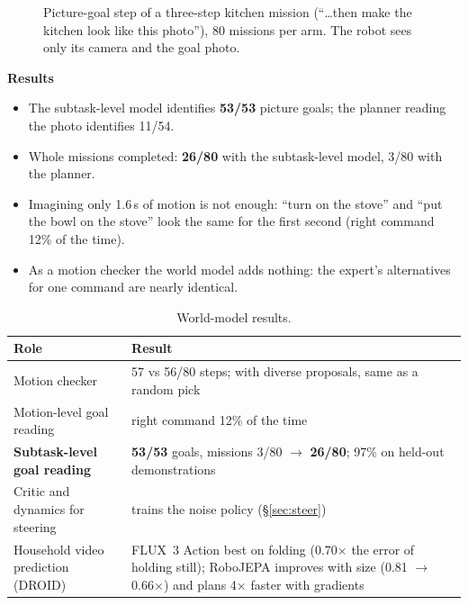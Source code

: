 \documentclass[11pt,a4paper]{article}
\newcommand{\sub}[1]{\par\needspace{4\baselineskip}\smallskip\noindent\textbf{#1}\par}
\begin{document}
\begin{figure}[!htbp]\centering
{}
\caption{Picture-goal step of a three-step kitchen mission (``\ldots then make the kitchen look like this photo''), 80 missions per arm. The robot sees only its camera and the goal photo.}
\label{fig:wm}
\end{figure}

\sub{Results}
\begin{itemize}
\item The subtask-level model identifies \textbf{53/53} picture goals; the planner reading the photo identifies 11/54.
\item Whole missions completed: \textbf{26/80} with the subtask-level model, 3/80 with the planner.
\item Imagining only 1.6\,s of motion is not enough: ``turn on the stove'' and ``put the bowl on the stove'' look the same for the first second (right command 12\% of the time).
\item As a motion checker the world model adds nothing: the expert's alternatives for one command are nearly identical.
\end{itemize}

\begin{table}[!htbp]\centering\small
\begin{tabularx}{\textwidth}{P{4.4cm}Y}
\toprule
Role & Result \\
\midrule
Motion checker & 57 vs 56/80 steps; with diverse proposals, same as a random pick \\
Motion-level goal reading & right command 12\% of the time \\
\textbf{Subtask-level goal reading} & \textbf{53/53} goals, missions 3/80 $\rightarrow$ \textbf{26/80}; 97\% on held-out demonstrations \\
Critic and dynamics for steering & trains the noise policy (\S\ref{sec:steer}) \\
Household video prediction (DROID) & FLUX~3 Action best on folding (0.70$\times$ the error of holding still); RoboJEPA improves with size (0.81 $\rightarrow$ 0.66$\times$) and plans 4$\times$ faster with gradients \\
\bottomrule
\end{tabularx}
\caption{World-model results.}
\end{table}
\end{document}

